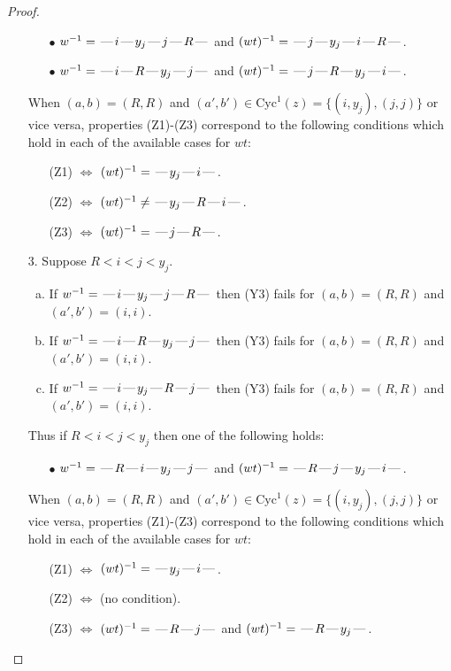 \documentclass[10pt]{article}
\theoremstyle{definition}
\theoremstyle{definition}
\def\dash{\text{\hspace{0.5mm}---\hspace{0.5mm}}}
\def\Cyc{\mathrm{Cyc}}
\begin{document}
\begin{proof}
\begin{enumerate}
\begin{enumerate}
\item[$\bullet$] $w^{-1} = \dash i\dash y_j\dash j\dash R\dash $ and $(wt)^{-1} = \dash j\dash y_j\dash i\dash R\dash $.
\item[$\bullet$] $w^{-1} = \dash i\dash R\dash y_j\dash j\dash $ and $(wt)^{-1} = \dash j\dash R\dash y_j\dash i\dash $.
\end{enumerate}
When $(a,b)= (R,R)$ and $(a',b')\in \Cyc^1(z)=\{(i,y_j),(j,j)\}$ or vice versa,
properties (Z1)-(Z3) correspond to the following conditions which
hold in each of the available cases for $wt$:
\begin{enumerate}
\item[](Z1) $\Leftrightarrow$ $(wt)^{-1} = \dash y_j \dash i \dash$.
\item[](Z2) $\Leftrightarrow$ $(wt)^{-1} \neq \dash y_j \dash R \dash i \dash$.
\item[](Z3) $\Leftrightarrow$ $(wt)^{-1} = \dash j \dash R \dash$.
\end{enumerate}
\item[$3$.] Suppose $R < i < j < y_j$.
\begin{enumerate}[(a)]
\item If $w^{-1} = \dash i\dash y_j\dash j\dash R\dash $ then (Y3) fails for $(a,b)=(R,R)$ and $(a',b')=(i,i)$.
\item If $w^{-1} = \dash i\dash R\dash y_j\dash j\dash $ then (Y3) fails for $(a,b)=(R,R)$ and $(a',b')=(i,i)$.
\item If $w^{-1} = \dash i\dash y_j\dash R\dash j\dash $ then (Y3) fails for $(a,b)=(R,R)$ and $(a',b')=(i,i)$.
\end{enumerate}
Thus if $R < i < j < y_j$ then one of the following holds:
\begin{enumerate}
\item[$\bullet$] $w^{-1} = \dash R\dash i\dash y_j\dash j\dash $ and $(wt)^{-1} = \dash R\dash j\dash y_j\dash i\dash $.
\end{enumerate}
When $(a,b)= (R,R)$ and $(a',b')\in \Cyc^1(z)=\{(i,y_j),(j,j)\}$ or vice versa,
properties (Z1)-(Z3) correspond to the following conditions which
hold in each of the available cases for $wt$:
\begin{enumerate}
\item[](Z1) $\Leftrightarrow$ $(wt)^{-1} = \dash y_j \dash i \dash$.
\item[](Z2) $\Leftrightarrow$ (no condition).
\item[](Z3) $\Leftrightarrow$ $(wt)^{-1} = \dash R \dash j \dash$  and $(wt)^{-1} = \dash R \dash y_j \dash$.

\end{enumerate}
\end{enumerate}
\end{proof}
\end{document}
